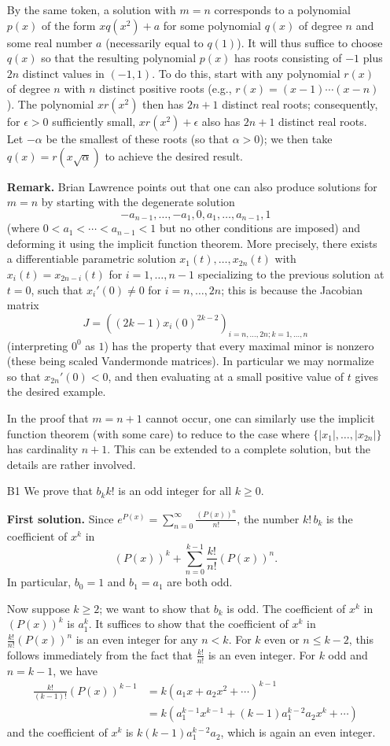 \documentclass[amssymb,twocolumn,pra,10pt,aps]{revtex4-1}
\begin{document}
\begin{itemize}
By the same token, a solution with $m=n$ corresponds to a polynomial $p(x)$ of the form $xq(x^2) + a$ for some polynomial $q(x)$ of degree $n$ and some real number $a$ (necessarily equal to $q(1)$). It will thus suffice to choose $q(x)$ so that the resulting polynomial $p(x)$ has roots consisting of $-1$ plus $2n$ distinct values in $(-1,1)$. To do this, start with any polynomial $r(x)$ of degree $n$ with $n$ distinct positive roots (e.g., $r(x) = (x-1)\cdots(x-n)$). 
The polynomial $x r(x^2)$ then has $2n+1$ distinct real roots;
consequently, for $\epsilon > 0$ sufficiently small, $xr(x^2) + \epsilon$ also has $2n+1$ distinct real roots. Let $-\alpha$ be the smallest of these roots (so that $\alpha > 0$); we then take $q(x) = r(x\sqrt{\alpha})$ to achieve the desired result.

\noindent
\textbf{Remark.}
Brian Lawrence points out that one can also produce solutions for $m=n$ by starting with the degenerate solution
\[
-a_{n-1}, \ldots, -a_1, 0, a_1, \ldots, a_{n-1}, 1
\]
(where $0 < a_1 < \cdots < a_{n-1} < 1$ but no other conditions are imposed) and deforming it using the implicit function theorem. More
precisely, there exists a differentiable parametric solution $x_1(t),\dots,x_{2n}(t)$ with $x_i(t) = x_{2n-i}(t)$ for $i=1,\dots,n-1$ specializing to the previous solution at $t=0$,
such that $x_i'(0) \neq 0$ for $i=n,\dots,2n$; this is because the Jacobian matrix
\[
J = ((2k-1) x_i(0)^{2k-2})_{i=n,\dots,2n; k=1,\dots,n}
\]
(interpreting $0^0$ as $1$) has the property that every maximal minor is nonzero (these being scaled Vandermonde matrices).
In particular we may normalize so that $x_{2n}'(0) < 0$, and then evaluating at a small positive value of $t$ gives the desired example.

In the proof that $m=n+1$ cannot occur, one can similarly use the implicit function theorem (with some care) to reduce to the case where $\{|x_1|,\dots,|x_{2n}|\}$ has cardinality $n+1$. This can be extended to a complete solution, but the details are rather involved.

\item[B1]
We prove that $b_k k!$ is an odd integer for all $k \geq 0$.

\textbf{First solution.}
Since $e^{P(x)} = \sum_{n=0}^\infty \frac{(P(x))^n}{n!}$, the number $k!\,b_k$ is the coefficient of $x^k$ in
\[
(P(x))^k + \sum_{n=0}^{k-1} \frac{k!}{n!}(P(x))^n.
\]
In particular, $b_0=1$ and $b_1=a_1$ are both odd. 

Now suppose $k \geq 2$; we want to show that $b_k$ is odd. The coefficient of $x^k$ in $(P(x))^k$ is $a_1^k$. It suffices to show that the coefficient of $x^k$ in $\frac{k!}{n!}(P(x))^n$ is an even integer for any $n<k$. For $k$ even or $n \leq k-2$, this follows immediately from the fact that $\frac{k!}{n!}$ is an even integer. For $k$ odd and $n=k-1$, we have
\begin{align*}
\frac{k!}{(k-1)!}(P(x))^{k-1} &= k(a_1x+a_2x^2+\cdots)^{k-1} \\
&= k(a_1^{k-1}x^{k-1}+(k-1)a_1^{k-2}a_2x^k+\cdots)
\end{align*}
and the coefficient of $x^k$ is $k(k-1)a_1^{k-2}a_2$, which is again an even integer.


\end{itemize}
\end{document}
